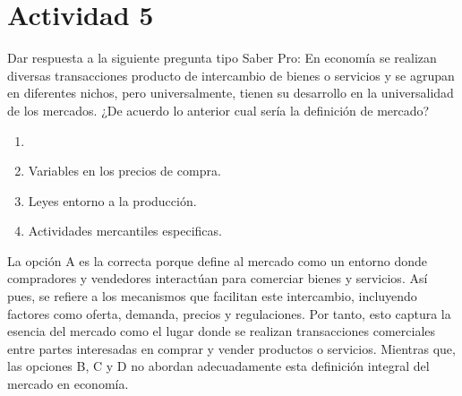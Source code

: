 \newpage
\clearpage
\justify
\fontsize{12pt}{14}
\setlength{\parindent}{0pt}

\section{Actividad 5}
\normalsize Dar respuesta a la siguiente pregunta tipo Saber Pro: En
economía se realizan diversas transacciones producto de intercambio de
bienes o servicios y se agrupan en diferentes nichos, pero
universalmente, tienen su desarrollo en la universalidad de los mercados.
¿De acuerdo lo anterior cual sería la definición de mercado?

\begin{enumerate}[label=\Alph*)]
    \item \colorbox{yellow}{}
    \item Variables en los precios de compra.
    \item Leyes entorno a la producción.
    \item Actividades mercantiles especificas.    
\end{enumerate}

\normalsize La opción A es la correcta porque define al mercado como un entorno donde compradores y vendedores interactúan para comerciar bienes y servicios. Así pues, se refiere a los mecanismos que facilitan este intercambio, incluyendo factores como oferta, demanda, precios y regulaciones. Por tanto, esto captura la esencia del mercado como el lugar donde se realizan transacciones comerciales entre partes interesadas en comprar y vender productos o servicios. Mientras que, las opciones B, C y D no abordan adecuadamente esta definición integral del mercado en economía.